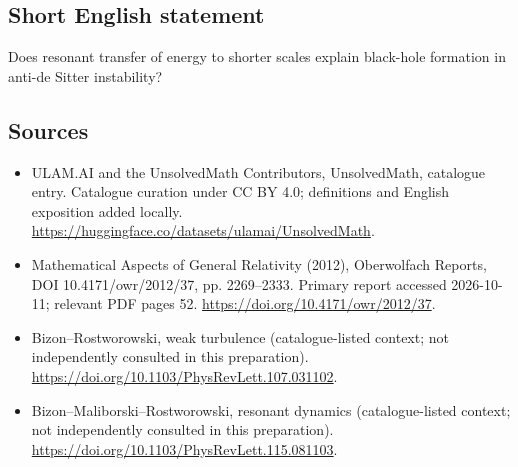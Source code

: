 \documentclass[11pt]{article}
\begin{document}
\subsection{Short English statement}
Does resonant transfer of energy to shorter scales explain black-hole formation in anti-de Sitter instability?
\subsection{Sources}
\begin{itemize}
\item[\hypertarget{source:statement:1}{S1}] ULAM.AI and the UnsolvedMath Contributors, UnsolvedMath, catalogue entry. Catalogue curation under CC BY 4.0; definitions and English exposition added locally.
\url{https://huggingface.co/datasets/ulamai/UnsolvedMath}.
\item[\hypertarget{source:statement:2}{S2}] Mathematical Aspects of General Relativity (2012), Oberwolfach Reports, DOI 10.4171/owr/2012/37, pp. 2269--2333. Primary report accessed 2026-10-11; relevant PDF pages 52.
\url{https://doi.org/10.4171/owr/2012/37}.
\item[\hypertarget{source:statement:3}{S3}] Bizon--Rostworowski, weak turbulence (catalogue-listed context; not independently consulted in this preparation).
\url{https://doi.org/10.1103/PhysRevLett.107.031102}.
\item[\hypertarget{source:statement:4}{S4}] Bizon--Maliborski--Rostworowski, resonant dynamics (catalogue-listed context; not independently consulted in this preparation).
\url{https://doi.org/10.1103/PhysRevLett.115.081103}.
\end{itemize}
\label{end:statement}
\end{document}
